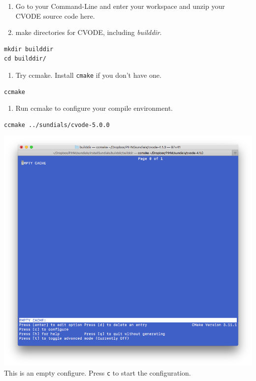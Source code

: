 \documentclass[
]{scrbook}
\providecommand{\tightlist}{%
  \setlength{\itemsep}{0pt}\setlength{\parskip}{0pt}}
\begin{document}
\begin{enumerate}
\def\labelenumi{\arabic{enumi}.}
\tightlist
\item
  Go to your Command-Line and enter your workspace and unzip your CVODE source code here.
\item
  make directories for CVODE, including \emph{builddir}.
\end{enumerate}

\begin{verbatim}
mkdir builddir
cd builddir/
\end{verbatim}

\begin{enumerate}
\def\labelenumi{\arabic{enumi}.}
\tightlist
\item
  Try ccmake. Install \texttt{cmake} if you don't have one.
\end{enumerate}

\begin{verbatim}
ccmake 
\end{verbatim}

\begin{enumerate}
\def\labelenumi{\arabic{enumi}.}
\tightlist
\item
  Run ccmake to configure your compile environment.
\end{enumerate}

\begin{verbatim}
ccmake ../sundials/cvode-5.0.0
\end{verbatim}

\includegraphics{Fig/ccmake/1.png}
This is an empty configure. Press \texttt{c} to start the configuration.
\end{document}

